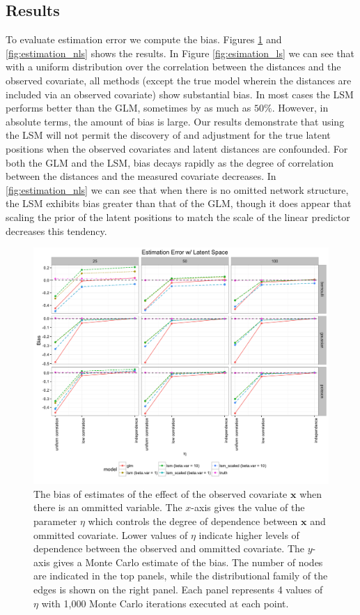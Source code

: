 \documentclass[11pt]{article}
\begin{document}
\subsection{Results}

To evaluate estimation error we compute the bias. Figures \ref{fig:estimation_ls} and \ref{fig:estimation_nls} shows the results. In Figure \ref{fig:esimation_ls} we can see that with a uniform distribution over the correlation between the distances and the observed covariate, all methods (except the true model wherein the distances are included via an observed covariate) show substantial bias. In most cases the LSM performs better than the GLM, sometimes by as much as $50\%$. However, in absolute terms, the amount of bias is large. Our results demonstrate that using the LSM will not permit the discovery of and adjustment for the true latent positions when the observed covariates and latent distances are confounded.  For both the GLM and the LSM, bias decays rapidly as the degree of correlation between the distances and the measured covariate decreases. In \ref{fig:estimation_nls} we can see that when there is no omitted network structure, the LSM exhibits bias greater than that of the GLM, though it does appear that scaling the prior of the latent positions to match the scale of the linear predictor decreases this tendency. 

\begin{figure}
\includegraphics[width=\textwidth]{figures/estimation_ls.png}
\caption{The bias of estimates of the effect of the observed covariate $\mathbf{x}$ when there is an ommitted variable. The $x$-axis gives the value of the parameter $\eta$ which controls the degree of dependence between $\mathbf{x}$ and ommitted covariate. Lower values of $\eta$ indicate higher levels of dependence between the observed and ommitted covariate. The $y$-axis gives a Monte Carlo estimate of the bias. The number of nodes are indicated in the top panels, while the distributional family of the edges is shown on the right panel. Each panel represents 4 values of $\eta$ with 1,000 Monte Carlo iterations executed at each point.
\label{fig:estimation_ls}}
\end{figure}
\end{document}
